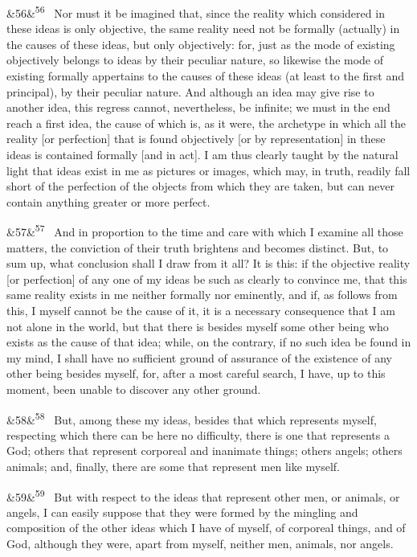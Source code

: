 \documentclass[12pt]{article}
\newcommand{\para}[1][]{\par\noindent\ifx&#1&\else\textsuperscript{\footnotesize #1}~\fi}
\begin{document}
\para[56] Nor must it be imagined that, since the reality which considered in these ideas is only objective, the same reality need not be formally (actually) in the causes of these ideas, but only objectively: for, just as the mode of existing objectively belongs to ideas by their peculiar nature, so likewise the mode of existing formally appertains to the causes of these ideas (at least to the first and principal), by their peculiar nature. And although an idea may give rise to another idea, this regress cannot, nevertheless, be infinite; we must in the end reach a first idea, the cause of which is, as it were, the archetype in which all the reality [or perfection] that is found objectively [or by representation] in these ideas is contained formally [and in act]. I am thus clearly taught by the natural light that ideas exist in me as pictures or images, which may, in truth, readily fall short of the perfection of the objects from which they are taken, but can never contain anything greater or more perfect.

\para[57] And in proportion to the time and care with which I examine all those matters, the conviction of their truth brightens and becomes distinct. But, to sum up, what conclusion shall I draw from it all? It is this: if the objective reality [or perfection] of any one of my ideas be such as clearly to convince me, that this same reality exists in me neither formally nor eminently, and if, as follows from this, I myself cannot be the cause of it, it is a necessary consequence that I am not alone in the world, but that there is besides myself some other being who exists as the cause of that idea; while, on the contrary, if no such idea be found in my mind, I shall have no sufficient ground of assurance of the existence of any other being besides myself, for, after a most careful search, I have, up to this moment, been unable to discover any other ground.

\para[58] But, among these my ideas, besides that which represents myself, respecting which there can be here no difficulty, there is one that represents a God; others that represent corporeal and inanimate things; others angels; others animals; and, finally, there are some that represent men like myself.

\para[59] But with respect to the ideas that represent other men, or animals, or angels, I can easily suppose that they were formed by the mingling and composition of the other ideas which I have of myself, of corporeal things, and of God, although they were, apart from myself, neither men, animals, nor angels.
\end{document}
